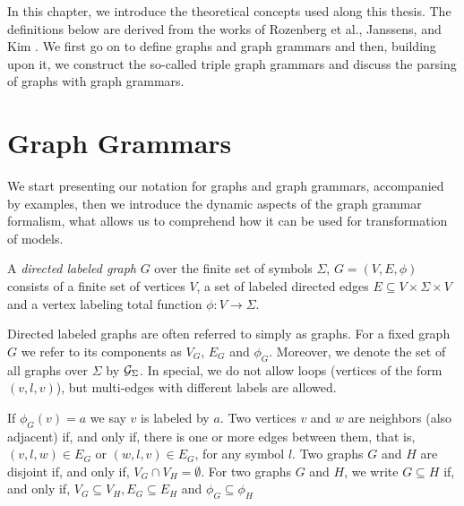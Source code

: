 
In this chapter, we introduce the theoretical concepts used along this thesis. The definitions below are derived from the works of Rozenberg et al., Janssens, and Kim \cite{rozenberg1986boundary, janssens1982graph,kim2001efficient}.
We first go on to define graphs and graph grammars and then, building upon it, we construct the so-called triple graph grammars and discuss the parsing of graphs with graph grammars.

\section{Graph Grammars}
We start presenting our notation for graphs and graph grammars, accompanied by examples, then we introduce the dynamic aspects of the graph grammar formalism, what allows us to comprehend how it can be used for transformation of models.

\begin{definition}
	\label{def:graph}
	A \emph{directed labeled graph} $G$ over the finite set of symbols $\Sigma$, $G = (V, E, \phi)$ consists of a finite set of vertices $V$, a set of labeled directed edges $E \subseteq V \times \Sigma \times V$ and a vertex labeling total function $\phi : V \to \Sigma$.
\end{definition}

Directed labeled graphs are often referred to simply as graphs. For a fixed graph $G$ we refer to its components as $V_G$, $E_G$ and $\phi_G$. Moreover, we denote the set of all graphs over $\Sigma$ by $\mathcal{G}_{\Sigma}$. In special, we do not allow loops (vertices of the form $(v,l,v)$), but multi-edges with different labels are allowed.

If $\phi_G(v) = a$ we say $v$ is labeled by $a$. Two vertices $v$ and $w$ are neighbors (also adjacent) if, and only if, there is one or more edges between them, that is, $(v,l,w) \in E_G$ or $(w,l,v) \in E_G$, for any symbol $l$. Two graphs $G$ and $H$ are disjoint if, and only if, $V_G \cap V_H = \emptyset$. For two graphs $G$ and $H$, we write $G \subseteq H$ if, and only if, $V_G \subseteq V_H, E_G \subseteq E_H$ and $\phi_G \subseteq \phi_H$

